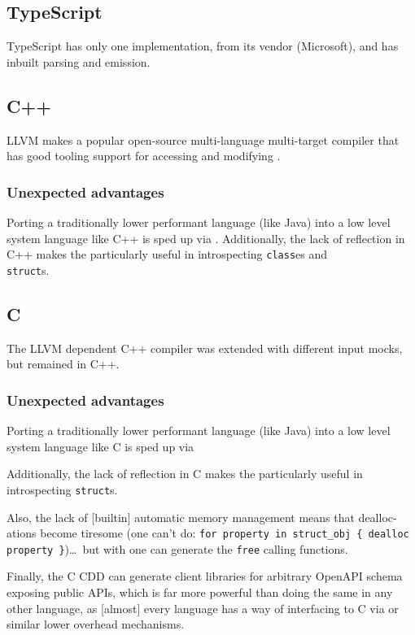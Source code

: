 \subsection{TypeScript}
TypeScript has only one implementation, from its vendor (Microsoft), and has inbuilt  parsing and emission.

\subsection{C++}
LLVM makes a popular open-source multi-language multi-target compiler that has good tooling support for accessing and modifying .

\subsubsection{Unexpected advantages}
Porting a traditionally lower performant language (like Java) into a low level system language like C++ is sped up via . Additionally, the lack of reflection in C++ makes the  particularly useful in introspecting \texttt{class}es and\\\texttt{struct}s.

\subsection{C}

The LLVM dependent C++ compiler was extended with different input mocks, but remained in C++.

\subsubsection{Unexpected advantages}
Porting a traditionally lower performant language (like Java) into a low level system language like C is sped up via 

Additionally, the lack of reflection in C makes the  particularly useful in introspecting \texttt{struct}s.

Also, the lack of [builtin] automatic memory management means that dealloc-\\ations become tiresome (one can't do: \texttt{for property in struct\_obj \{ dealloc property \}})\ldots~but with  one can generate the \texttt{free} calling functions.

Finally, the C CDD can generate client libraries for arbitrary OpenAPI schema exposing public APIs, which is far more powerful than doing the same in any other language, as [almost] every language has a way of interfacing to C via  or similar lower overhead mechanisms.


